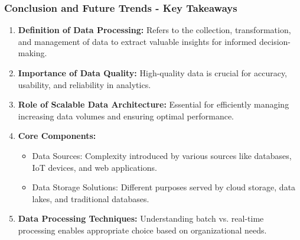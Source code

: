 \documentclass[aspectratio=169]{beamer}
\begin{document}
\begin{frame}[fragile]
    \frametitle{Conclusion and Future Trends - Key Takeaways}
    
    \begin{enumerate}
        \item \textbf{Definition of Data Processing:} Refers to the collection, transformation, and management of data to extract valuable insights for informed decision-making.
        
        \item \textbf{Importance of Data Quality:} High-quality data is crucial for accuracy, usability, and reliability in analytics.
        
        \item \textbf{Role of Scalable Data Architecture:} Essential for efficiently managing increasing data volumes and ensuring optimal performance.
        
        \item \textbf{Core Components:}
        \begin{itemize}
            \item Data Sources: Complexity introduced by various sources like databases, IoT devices, and web applications.
            \item Data Storage Solutions: Different purposes served by cloud storage, data lakes, and traditional databases.
        \end{itemize}
        
        \item \textbf{Data Processing Techniques:} Understanding batch vs. real-time processing enables appropriate choice based on organizational needs.
    \end{enumerate}
\end{frame}
\end{document}
